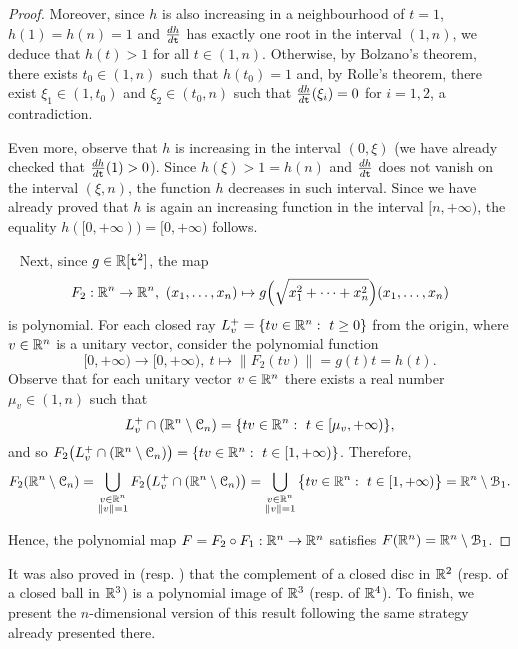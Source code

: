 \documentclass[11pt,a4paper]{amsart}
\theoremstyle{definition}
\theoremstyle{remark}
\newcounter{substep}
\def\thesubstep{\arabic{substep}}
\newenvironment{substeps}[1]{%
\refstepcounter{substep}\noindent{ (\ref{#1}.\thesubstep)\ }\ }%
{\em}
\newcommand{\ball}{{\EuScript B}}
\newcommand{\cube}{{\EuScript C}}
\begin{document}
\begin{proof}
Moreover, since $h$ is also increasing in a neighbourhood of $t=1$, $h(1)=h(n)=1$
and $\frac{dh}{d{\tt t}}$ has exactly one root in the interval $(1,n)$, we deduce that $h(t)>1$ for all $t\in(1,n)$. Otherwise, by Bolzano's theorem, there exists $t_0\in(1,n)$ such that $h(t_0)=1$ and, by Rolle's theorem, there exist $\xi_1\in(1,t_0)$ and $\xi_2\in(t_0,n)$ such that $\frac{dh}{d{\tt t}}(\xi_i)=0$ for $i=1,2$, a contradiction.

Even more, observe that $h$ is increasing in the interval $(0,\xi)$ (we have already checked that $\frac{dh}{d{\tt t}}(1)>0$). Since $h(\xi)>1=h(n)$ and $\frac{dh}{d{\tt t}}$ does not vanish on the interval $(\xi,n)$, the function $h$ decreases in such interval. Since we have already proved that $h$ is again an increasing function in the interval $[n,+\infty)$, the equality $h([0,+\infty))=[0,+\infty)$ follows.

\vspace{2mm}
\begin{substeps}{openball}
Next, since $g\in{\mathbb R}[{{\tt t}}^2]$, the map 
$$
F_2:\R^n\to\R^n,\ (x_1,\ldots,x_n)\mapsto g\Big(\sqrt{x_1^2+\cdots+x_n^2}\Big)(x_1,\ldots,x_n)
$$
is polynomial. For each closed ray $L_v^+=\{tv\in{\mathbb R}^n:\ t\geq0\}$ from the origin, where $v\in{\mathbb R}^n$ is a unitary vector, consider the polynomial function 
$$
[0,+\infty)\to[0,+\infty),\ t\mapsto\|F_2(tv)\|=g(t)t=h(t).
$$
Observe that for each unitary vector $v\in{\mathbb R}^n$ there exists a real number $\mu_v\in(1,n)$ such that
$$
L_v^+\cap(\R^n\setminus\cube_n)=\{tv\in\R^n:\ t\in[\mu_v,+\infty)\},
$$ 
and so $F_2\big(L_v^+\cap(\R^n\setminus\cube_n)\big)=\{tv\in\R^n:\ t\in[1,+\infty)\}$. Therefore, 
$$
F_2(\R^n\setminus\cube_n)=\bigcup_{\substack{v\in\R^n\\\|v\|=1}}F_2\big(L_v^+\cap(\R^n\setminus\cube_n)\big)=\bigcup_{\substack{v\in\R^n\\\|v\|=1}}\big\{tv\in\R^n:\ t\in[1,+\infty)\big\}=\R^n\setminus{\ball}_1.
$$
\end{substeps}

Hence, the polynomial map $F=F_2\circ F_1:{\mathbb R}^n\to{\mathbb R}^n$ satisfies $F(\R^n)=\R^n\setminus{\ball}_1$.
\end{proof}

It was also proved in \cite[4.2]{fg2} (resp. \cite[ 6.2]{fgu1}) that the complement of a closed disc in ${\mathbb R}^2$ (resp. of a closed ball in ${\mathbb R}^3$) is a polynomial image of ${\mathbb R}^3$ (resp. of ${\mathbb R}^4$). To finish, we present the $n$-dimensional version of this result following the same strategy already presented there.
\end{document}
